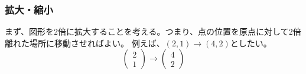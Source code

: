 \documentclass[10pt]{jsreport}
\theoremstyle{definition}%
\newcommand{\kakko}[1]{\left(#1 \right)} %
\numberwithin{equation}{section}%
\begin{document}
\subsubsection{拡大・縮小}
まず、図形を$2$倍に拡大することを考える。つまり、点の位置を原点に対して$2$倍離れた場所に移動させればよい。
例えば、$(2,1)\to (4,2)$としたい。
\begin{equation}
  \kakko{ 
    \begin{matrix}
      2\\
      1
    \end{matrix}
  } \to 
    \kakko{ 
      \begin{matrix}
        4\\
        2
      \end{matrix}
    } 
\end{equation}
\end{document}
